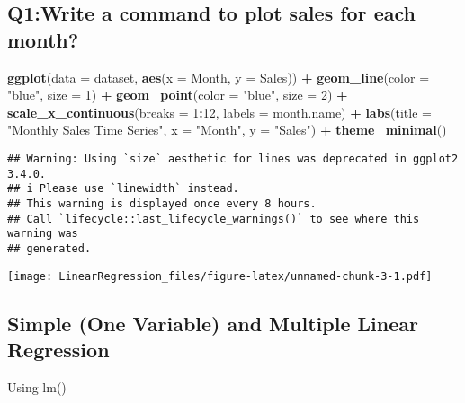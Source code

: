 \documentclass[
]{article}
\newenvironment{Shaded}{\begin{snugshade}}{\end{snugshade}}
\newcommand{\AttributeTok}[1]{\textcolor[rgb]{0.13,0.29,0.53}{#1}}
\newcommand{\DecValTok}[1]{\textcolor[rgb]{0.00,0.00,0.81}{#1}}
\newcommand{\FunctionTok}[1]{\textcolor[rgb]{0.13,0.29,0.53}{\textbf{#1}}}
\newcommand{\NormalTok}[1]{#1}
\newcommand{\SpecialCharTok}[1]{\textcolor[rgb]{0.81,0.36,0.00}{\textbf{#1}}}
\newcommand{\StringTok}[1]{\textcolor[rgb]{0.31,0.60,0.02}{#1}}
\begin{document}
\hypertarget{q1write-a-command-to-plot-sales-for-each-month}{%
\subsection{Q1:Write a command to plot sales for each
month?}\label{q1write-a-command-to-plot-sales-for-each-month}}

\begin{Shaded}
\begin{Highlighting}[]
\FunctionTok{ggplot}\NormalTok{(}\AttributeTok{data =}\NormalTok{ dataset, }\FunctionTok{aes}\NormalTok{(}\AttributeTok{x =}\NormalTok{ Month, }\AttributeTok{y =}\NormalTok{ Sales)) }\SpecialCharTok{+}
  \FunctionTok{geom\_line}\NormalTok{(}\AttributeTok{color =} \StringTok{"blue"}\NormalTok{, }\AttributeTok{size =} \DecValTok{1}\NormalTok{) }\SpecialCharTok{+}
  \FunctionTok{geom\_point}\NormalTok{(}\AttributeTok{color =} \StringTok{"blue"}\NormalTok{, }\AttributeTok{size =} \DecValTok{2}\NormalTok{) }\SpecialCharTok{+}
  \FunctionTok{scale\_x\_continuous}\NormalTok{(}\AttributeTok{breaks =} \DecValTok{1}\SpecialCharTok{:}\DecValTok{12}\NormalTok{, }\AttributeTok{labels =}\NormalTok{ month.name) }\SpecialCharTok{+}
  \FunctionTok{labs}\NormalTok{(}\AttributeTok{title =} \StringTok{"Monthly Sales Time Series"}\NormalTok{, }\AttributeTok{x =} \StringTok{"Month"}\NormalTok{, }\AttributeTok{y =} \StringTok{"Sales"}\NormalTok{) }\SpecialCharTok{+}
  \FunctionTok{theme\_minimal}\NormalTok{()}
\end{Highlighting}
\end{Shaded}

\begin{verbatim}
## Warning: Using `size` aesthetic for lines was deprecated in ggplot2 3.4.0.
## i Please use `linewidth` instead.
## This warning is displayed once every 8 hours.
## Call `lifecycle::last_lifecycle_warnings()` to see where this warning was
## generated.
\end{verbatim}

\texttt{[image: LinearRegression\_files/figure-latex/unnamed-chunk-3-1.pdf]}

\hypertarget{simple-one-variable-and-multiple-linear-regression}{%
\subsection{Simple (One Variable) and Multiple Linear
Regression}\label{simple-one-variable-and-multiple-linear-regression}}

Using lm()
\end{document}
